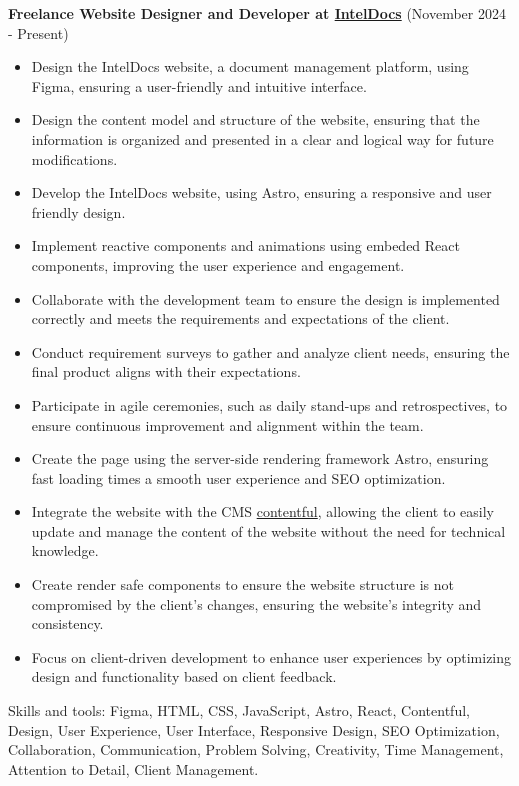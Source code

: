 \vspace*{0.2cm}
\textbf{Freelance Website Designer and Developer at \href{}{IntelDocs}} (November 2024 - Present)
\hfill
\vspace*{0.2cm}
\begin{minipage}{\linewidth}
\begin{itemize}[noitemsep]
    \item Design the IntelDocs website, a document management platform, using Figma, ensuring a user-friendly and intuitive interface.
    \item Design the content model and structure of the website, ensuring that the information is organized and presented in a clear and logical way for future modifications.
    \item Develop the IntelDocs website, using Astro, ensuring a responsive and user friendly design.
    \item Implement reactive components and animations using embeded React components, improving the user experience and engagement.
    \item Collaborate with the development team to ensure the design is implemented correctly and meets the requirements and expectations of the client.
    \item Conduct requirement surveys to gather and analyze client needs, ensuring the final product aligns with their expectations.
    \item Participate in agile ceremonies, such as daily stand-ups and retrospectives, to ensure continuous improvement and alignment within the team.
    \item Create the page using the server-side rendering framework Astro, ensuring fast loading times a smooth user experience and SEO optimization.
    \item Integrate the website with the CMS \href{https://www.contentful.com/}{contentful}, allowing the client to easily update and manage the content of the website without the need for technical knowledge.
    \item Create render safe components to ensure the website structure is not compromised by the client's changes, ensuring the website's integrity and consistency.
    \item Focus on client-driven development to enhance user experiences by optimizing design and functionality based on client feedback.
\end{itemize}
\hfill
\end{minipage}
Skills and tools: Figma, HTML, CSS, JavaScript, Astro, React, Contentful, Design, User Experience, User Interface, Responsive Design, SEO Optimization, Collaboration, Communication, Problem Solving, Creativity, Time Management, Attention to Detail, Client Management.

